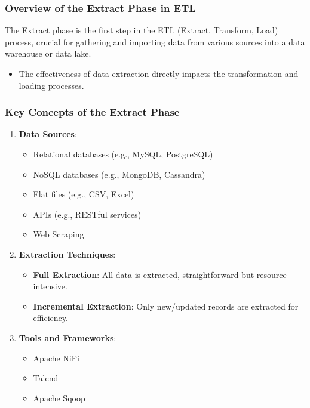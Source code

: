 \documentclass[aspectratio=169]{beamer}
\begin{document}
\begin{frame}[fragile]
  \frametitle{Overview of the Extract Phase in ETL}
  The Extract phase is the first step in the ETL (Extract, Transform, Load) process, crucial for gathering and importing data from various sources into a data warehouse or data lake. 
  \begin{itemize}
      \item The effectiveness of data extraction directly impacts the transformation and loading processes.
  \end{itemize}
\end{frame}

\begin{frame}[fragile]
  \frametitle{Key Concepts of the Extract Phase}
  \begin{enumerate}
      \item \textbf{Data Sources}:
      \begin{itemize}
          \item Relational databases (e.g., MySQL, PostgreSQL)
          \item NoSQL databases (e.g., MongoDB, Cassandra)
          \item Flat files (e.g., CSV, Excel)
          \item APIs (e.g., RESTful services)
          \item Web Scraping
      \end{itemize}
      
      \item \textbf{Extraction Techniques}:
      \begin{itemize}
          \item \textbf{Full Extraction}: All data is extracted, straightforward but resource-intensive. 
          \item \textbf{Incremental Extraction}: Only new/updated records are extracted for efficiency.
      \end{itemize}

      \item \textbf{Tools and Frameworks}:
      \begin{itemize}
          \item Apache NiFi
          \item Talend
          \item Apache Sqoop
      \end{itemize}
  \end{enumerate}
\end{frame}
\end{document}
